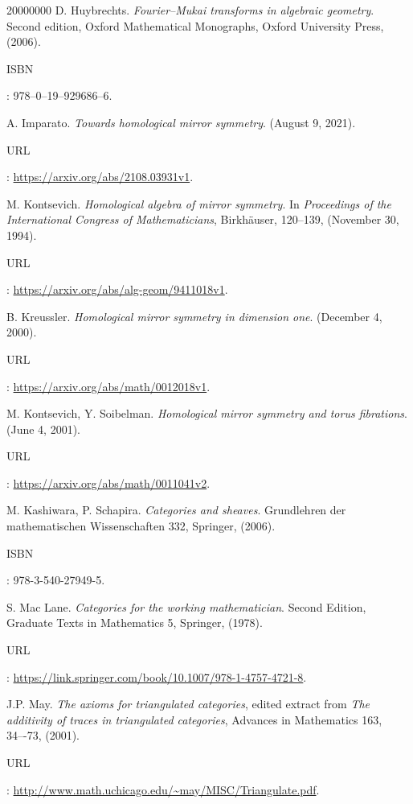 \begin{thebibliography}{20000000}
\bibitem[Huy06]{[Huy06]} D. Huybrechts. \textit{Fourier--Mukai transforms in algebraic geometry}. Second edition, Oxford Mathematical Monographs, Oxford University Press, (2006). \begin{footnotesize}ISBN\end{footnotesize}: 978–0–19–929686–6.

\bibitem[Imp21]{[Imp21]} A. Imparato. \textit{Towards homological mirror symmetry}. (August 9, 2021). \begin{footnotesize}URL\end{footnotesize}: \url{https://arxiv.org/abs/2108.03931v1}.

\bibitem[Kon94]{[Kon94]} M. Kontsevich. \textit{Homological algebra of mirror symmetry}. In \textit{Proceedings of the International Congress of Mathematicians}, Birkhäuser, 120--139, (November 30, 1994). \begin{footnotesize}URL\end{footnotesize}: \url{https://arxiv.org/abs/alg-geom/9411018v1}.

\bibitem[Kre00]{[Kre00]} B. Kreussler. \textit{Homological mirror symmetry in dimension one}. (December 4, 2000). \begin{footnotesize}URL\end{footnotesize}: \url{https://arxiv.org/abs/math/0012018v1}.

\bibitem[KS01]{[KS01]} M. Kontsevich, Y. Soibelman. \textit{Homological mirror symmetry and torus fibrations}. (June 4, 2001). \begin{footnotesize}URL\end{footnotesize}: \url{https://arxiv.org/abs/math/0011041v2}.

\bibitem[KS06]{[KS06]} M. Kashiwara, P. Schapira. \textit{Categories and sheaves}. Grundlehren der mathematischen Wissenschaften 332, Springer, (2006). \begin{footnotesize}ISBN\end{footnotesize}: 978-3-540-27949-5.

\bibitem[Mac78]{[Mac78]} S. Mac Lane. \textit{Categories for the working mathematician}. Second Edition, Graduate Texts in Mathematics 5, Springer, (1978). \begin{footnotesize}URL\end{footnotesize}: \url{https://link.springer.com/book/10.1007/978-1-4757-4721-8}. 

\bibitem[May01]{[May01]} J.P. May. \textit{The axioms for triangulated categories}, edited extract from \textit{The additivity of traces in triangulated categories}, Advances in Mathematics 163, 34–-73, (2001). \begin{footnotesize}URL\end{footnotesize}: \url{http://www.math.uchicago.edu/~may/MISC/Triangulate.pdf}.


\end{thebibliography}
